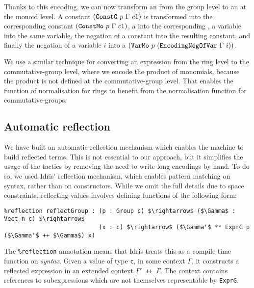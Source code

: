 Thanks to this encoding, we can now transform an  from the group
level to an  at the monoid level. A constant $({\mbox{\texttt{ConstG}}}\ p\
\Gamma\ c1)$ is transformed into the corresponding constant
$({\mbox{\texttt{ConstMo}}}\ p\ \Gamma\ c1)$, a  into the corresponding
\code{PlusMo}, a variable into the same variable, the negation of a
constant into the resulting constant, and finally the negation of a variable
$i$ into a $(\code{VarMo}\ p\ (\code{EncodingNegOfVar}\ \Gamma\ i))$.

We use a similar technique for converting an expression from the ring level
to the commutative-group level, where we encode the product of monomials,
because the product is not defined at the commutative-group level.
That enables the function of normalisation for rings to benefit from the
normalisation function for commutative-groups.


\subsection{Automatic reflection}
		
We have built an automatic reflection mechanism which enables the machine to
build reflected terms. This is not essential to our
approach, but it simplifies the usage of the tactics by removing the need to
write long encodings by hand.  To do so, we used Idris' reflection mechanism,
which enables pattern matching on syntax, rather than on constructors. 
While we omit the full details due to space constraints, reflecting values
involves defining functions of the following form:

\begin{lstlisting}
%reflection reflectGroup : (p : Group c) $\rightarrow$ ($\Gamma$ : Vect n c) $\rightarrow$ 
                           (x : c) $\rightarrow$ ($\Gamma'$ ** ExprG p ($\Gamma'$ ++ $\Gamma$) x)
\end{lstlisting}

The \texttt{\%reflection} annotation means that Idris treats this as a 
compile time function on \emph{syntax}. Given a value of type
\texttt{c}, in some context $\Gamma$, it constructs a reflected expression 
in an extended context \texttt{$\Gamma'$ ++ $\Gamma$}. The context
contains references to subexpressions 
which are not themselves representable by \texttt{ExprG}.

